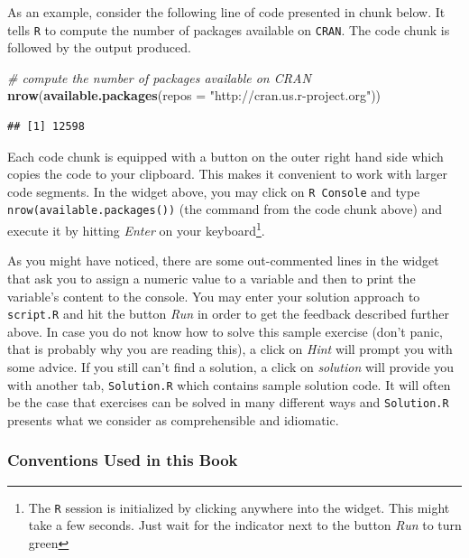 \documentclass[]{book}
\newenvironment{Shaded}{\begin{snugshade}}{\end{snugshade}}
\newcommand{\KeywordTok}[1]{\textcolor[rgb]{0.13,0.29,0.53}{\textbf{#1}}}
\newcommand{\DataTypeTok}[1]{\textcolor[rgb]{0.13,0.29,0.53}{#1}}
\newcommand{\StringTok}[1]{\textcolor[rgb]{0.31,0.60,0.02}{#1}}
\newcommand{\CommentTok}[1]{\textcolor[rgb]{0.56,0.35,0.01}{\textit{#1}}}
\newcommand{\NormalTok}[1]{#1}
\let\rmarkdownfootnote\footnote%
\def\footnote{\protect\rmarkdownfootnote}
\theoremstyle{definition}
\theoremstyle{definition}
\theoremstyle{definition}
\theoremstyle{remark}
\begin{document}
As an example, consider the following line of code presented in chunk
below. It tells \texttt{R} to compute the number of packages available
on \texttt{CRAN}. The code chunk is followed by the output produced.

\begin{Shaded}
\begin{Highlighting}[]
\CommentTok{# compute the number of packages available on CRAN}
\KeywordTok{nrow}\NormalTok{(}\KeywordTok{available.packages}\NormalTok{(}\DataTypeTok{repos =} \StringTok{"http://cran.us.r-project.org"}\NormalTok{))}
\end{Highlighting}
\end{Shaded}

\begin{verbatim}
## [1] 12598
\end{verbatim}

Each code chunk is equipped with a button on the outer right hand side
which copies the code to your clipboard. This makes it convenient to
work with larger code segments. In the widget above, you may click on
\texttt{R Console} and type \texttt{nrow(available.packages())} (the
command from the code chunk above) and execute it by hitting
\emph{Enter} on your keyboard\footnote{The \texttt{R} session is
  initialized by clicking anywhere into the widget. This might take a
  few seconds. Just wait for the indicator next to the button \emph{Run}
  to turn green}.

As you might have noticed, there are some out-commented lines in the
widget that ask you to assign a numeric value to a variable and then to
print the variable's content to the console. You may enter your solution
approach to \texttt{script.R} and hit the button \emph{Run} in order to
get the feedback described further above. In case you do not know how to
solve this sample exercise (don't panic, that is probably why you are
reading this), a click on \emph{Hint} will prompt you with some advice.
If you still can't find a solution, a click on \emph{solution} will
provide you with another tab, \texttt{Solution.R} which contains sample
solution code. It will often be the case that exercises can be solved in
many different ways and \texttt{Solution.R} presents what we consider as
comprehensible and idiomatic.

\subsubsection*{Conventions Used in this
Book}\label{conventions-used-in-this-book}
\end{document}
